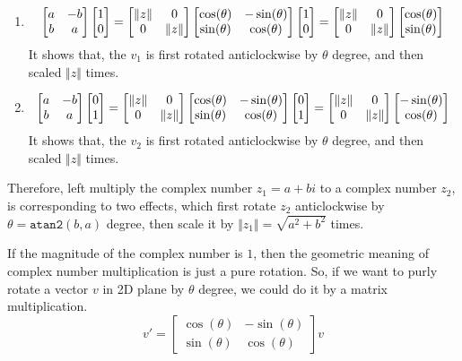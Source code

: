 \documentclass[runningheads]{llncs}
\newcommand{\Clen}[1]{\Vert #1\Vert}
\newcommand{\bmatL}{\begin{bmatrix}}
\newcommand{\bmatR}{\end{bmatrix}}
\begin{document}
\begin{enumerate}[(1)]
\item
  \begin{equation}
    \bmatL a&-b\\b&a\bmatR \bmatL 1\\0\bmatR 
    =\bmatL \Clen{z}&0\\0&\Clen{z}\bmatR \bmatL \cos(\theta)&-\sin(\theta)\\\sin(\theta)&\cos(\theta)\bmatR \bmatL 1\\0\bmatR
    =\bmatL \Clen{z}&0\\0&\Clen{z}\bmatR \bmatL \cos(\theta)\\\sin(\theta)\bmatR\\
  \end{equation}
  It shows that, the $v_1$ is first rotated anticlockwise by $\theta$ degree, and then scaled $\Clen{z}$ times.
\item
  \begin{equation}
    \bmatL a&-b\\b&a\bmatR \bmatL 0\\1\bmatR 
    =\bmatL \Clen{z}&0\\0&\Clen{z}\bmatR \bmatL \cos(\theta)&-\sin(\theta)\\\sin(\theta)&\cos(\theta)\bmatR \bmatL 0\\1\bmatR
    =\bmatL \Clen{z}&0\\0&\Clen{z}\bmatR \bmatL -\sin(\theta)\\\cos(\theta)\bmatR\\
  \end{equation}
  It shows that, the $v_2$ is first rotated anticlockwise by $\theta$ degree, and then scaled $\Clen{z}$ times.
\end{enumerate}

Therefore, left multiply the complex number $z_1=a+bi$ to a complex number $z_2$, is corresponding to two effects, which first rotate $z_2$ anticlockwise by $\theta=\mathtt{atan2}(b,a)$ degree, then scale it by $\Vert z_1\Vert=\sqrt{a^2+b^2}$ times.

If the magnitude of the complex number is $1$, then the geometric meaning of complex number multiplication is just a pure rotation.
So, if we want to purly rotate a vector $v$ in 2D plane by $\theta$ degree, we could do it by a matrix multiplication.
\begin{equation}\label{pure_rot_2D_mmul}
  v'= \bmatL \cos(\theta)&-\sin(\theta)\\\sin(\theta)&\cos(\theta)\bmatR v
\end{equation}
\end{document}
